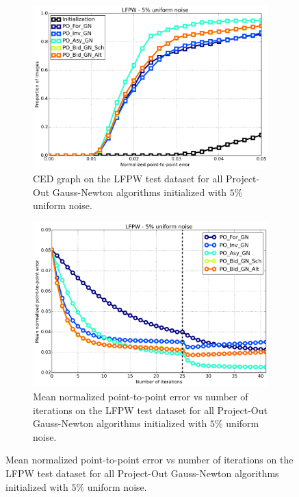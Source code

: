 \begin{figure}[p]
	\centering
	\begin{subfigure}{0.48\textwidth}
	    \includegraphics[width=\textwidth]{experiments/algorithms/po_gn/ced_po_gn_5.png}
	    \caption{CED graph on the LFPW test dataset for all Project-Out Gauss-Newton algorithms initialized with $5\%$ uniform noise.}
	    \label{fig:ced_po_gn_5}
	\end{subfigure}
	\hfill
	\begin{subfigure}{0.48\textwidth}
	    \includegraphics[width=\textwidth]{experiments/algorithms/po_gn/mean_error_vs_iters_po_gn_5.png}
	    \caption{Mean normalized point-to-point error vs number of iterations on the LFPW test dataset for all Project-Out Gauss-Newton algorithms initialized with $5\%$ uniform noise.}
	    \label{fig:mean_error_vs_iters_po_gn_5}

\end{subfigure}
\end{figure}
